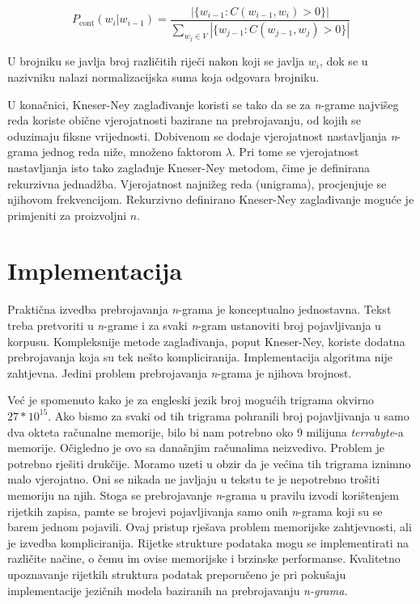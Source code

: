 \documentclass[times, utf8, diplomski, numeric]{fer}
\begin{document}
\[
P_{\text{cont}}(w_i | w_{i - 1}) =
  \frac{\left|\{w_{i - 1} : C(w_{i - 1}, w_i) > 0\}\right|}
  {\sum_{w_j \in V}\left|\{w_{j - 1} : C(w_{j - 1}, w_j) > 0\}\right|}
\]

U brojniku se javlja broj različitih riječi nakon koji se javlja $w_i$, dok se u nazivniku nalazi normalizacijska suma koja odgovara brojniku.

U konačnici, Kneser-Ney zaglađivanje koristi se tako da se za \textit{n}-grame najvišeg reda koriste obične vjerojatnosti bazirane na prebrojavanju, od kojih se oduzimaju fiksne vrijednosti. Dobivenom se dodaje vjerojatnost nastavljanja \textit{n}-grama jednog reda niže, množeno faktorom $\lambda$. Pri tome se vjerojatnost nastavljanja isto tako zaglađuje Kneser-Ney metodom, čime je definirana rekurzivna jednadžba. Vjerojatnost najnižeg reda (unigrama), procjenjuje se njihovom frekvencijom. Rekurzivno definirano Kneser-Ney zaglađivanje moguće je primjeniti za proizvoljni $n$.

\section{Implementacija}

Praktična izvedba prebrojavanja \textit{n}-grama je konceptualno jednostavna. Tekst treba pretvoriti u \textit{n}-grame i za svaki \textit{n}-gram ustanoviti broj pojavljivanja u korpusu. Kompleksnije metode zaglađivanja, poput Kneser-Ney, koriste dodatna prebrojavanja koja su tek nešto kompliciranija. Implementacija algoritma nije zahtjevna. Jedini problem prebrojavanja \textit{n}-grama je njihova brojnost.

Već je spomenuto kako je za engleski jezik broj mogućih trigrama okvirno $27 * 10^{15}$. Ako bismo za svaki od tih trigrama pohranili broj pojavljivanja u samo dva okteta računalne memorije, bilo bi nam potrebno oko 9 milijuna \textit{terrabyte}-a memorije. Očigledno je ovo sa današnjim računalima neizvedivo. Problem je potrebno rješiti drukčije. Moramo uzeti u obzir da je većina tih trigrama iznimno malo vjerojatno. Oni se nikada ne javljaju u tekstu te je nepotrebno trošiti memoriju na njih. Stoga se prebrojavanje \textit{n}-grama u pravilu izvodi korištenjem rijetkih  zapisa, pamte se brojevi pojavljivanja samo onih \textit{n}-grama koji su se barem jednom pojavili. Ovaj pristup rješava problem memorijske zahtjevnosti, ali je izvedba kompliciranija. Rijetke strukture podataka mogu se implementirati na različite načine, o čemu im ovise memorijske i brzinske performanse. Kvalitetno upoznavanje rijetkih struktura podatak preporučeno je pri pokušaju implementacije jezičnih modela baziranih na prebrojavanju \textit{n-grama}.
\end{document}
